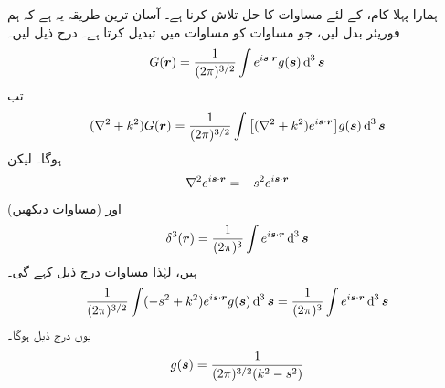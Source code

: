 ہمارا پہلا کام،  کے لئے مساوات  کا حل تلاش کرنا ہے۔ آسان ترین طریقہ یہ ہے کہ ہم فوریئر بدل لیں، جو  مساوات کو  مساوات میں تبدیل کرتا ہے۔ درج ذیل لیں۔
\begin{align}\label{مساوات_بکھراو_مان_لیں}
	G(\kvec{r})=\frac{1}{(2\pi)^{3/2}}\int e^{i\kvec{s}\cdot \kvec{r}}g(\kvec{s})\dif^{\,3}\kvec{s}
\end{align}
تب 
\begin{align*}
	(\nabla^2+k^2)G(\kvec{r}) = \frac{1}{(2\pi)^{3/2}}\int\big[(\nabla^2+k^2)e^{i\kvec{s}\cdot \kvec{r}}\big]g(\kvec{s})\dif^{\,3}\kvec{s}
\end{align*}
ہوگا۔ لیکن
\begin{align}
	\nabla^2e^{i{{\boldsymbol{s}}}\cdot {\ensuremath{{\boldsymbol{r}}}}} = -s^2 e^{i{{\boldsymbol{s}}}\cdot {\ensuremath{{\boldsymbol{r}}}}}
\end{align}
اور (مساوات  دیکھیں)
\begin{align}
	\delta^3(\kvec{r})=\frac{1}{(2\pi)^3}\int e^{i\kvec{s}\cdot \kvec{r}}\dif^{\,3}\kvec{s}
\end{align}
ہیں، لہٰذا مساوات  درج ذیل کہے گی۔
\begin{align*}
	\frac{1}{(2\pi)^{3/2}}\int(-s^2+k^2)e^{i\kvec{s}\cdot \kvec{r}}g(\kvec{s})\dif^{\,3}\kvec{s} = \frac{1}{(2\pi)^3}\int e^{i\kvec{s}\cdot \kvec{r}}\dif^{\,3}\kvec{s}
\end{align*}
یوں درج ذیل ہوگا۔
\begin{align}
	g({{\boldsymbol{s}}}) = \frac{1}{(2\pi)^{3/2}(k^2-s^2)}
\end{align}

